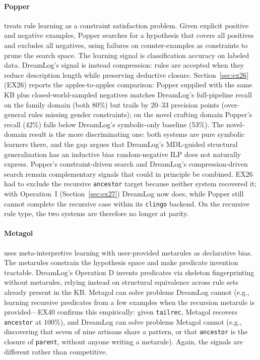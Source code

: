 \documentclass[10pt,conference]{IEEEtran}
\begin{document}
\paragraph{Popper~\cite{cropper2021learning}} treats rule learning as a constraint satisfaction problem. Given explicit positive and negative examples, Popper searches for a hypothesis that covers all positives and excludes all negatives, using failures on counter-examples as constraints to prune the search space. The learning signal is classification accuracy on labeled data. DreamLog's signal is instead compression: rules are accepted when they reduce description length while preserving deductive closure. Section~\ref{sec:ex26} (EX26) reports the apples-to-apples comparison: Popper supplied with the same KB plus closed-world-sampled negatives matches DreamLog's full-pipeline recall on the family domain (both 80\%) but trails by 20--33 precision points (over-general rules missing gender constraints); on the novel crafting domain Popper's recall (42\%) falls below DreamLog's symbolic-only baseline (53\%). The novel-domain result is the more discriminating one: both systems are pure symbolic learners there, and the gap argues that DreamLog's MDL-guided structural generalization has an inductive bias random-negative ILP does not naturally express. Popper's constraint-driven search and DreamLog's compression-driven search remain complementary signals that could in principle be combined. EX26 had to exclude the recursive \texttt{ancestor} target because neither system recovered it; with Operation~I (Section~\ref{sec:ex27}) DreamLog now does, while Popper still cannot complete the recursive case within its \texttt{clingo} backend. On the recursive rule type, the two systems are therefore no longer at parity.

\paragraph{Metagol~\cite{muggleton2014meta}} uses meta-interpretive learning with user-provided metarules as declarative bias. The metarules constrain the hypothesis space and make predicate invention tractable. DreamLog's Operation D invents predicates via skeleton fingerprinting without metarules, relying instead on structural equivalence across rule sets already present in the KB. Metagol can solve problems DreamLog cannot (e.g., learning recursive predicates from a few examples when the recursion metarule is provided---EX40 confirms this empirically: given \texttt{tailrec}, Metagol recovers \texttt{ancestor} at $100\%$), and DreamLog can solve problems Metagol cannot (e.g., discovering that seven of nine artisans share a pattern, or that \texttt{ancestor} is the closure of \texttt{parent}, without anyone writing a metarule). Again, the signals are different rather than competitive.
\end{document}

